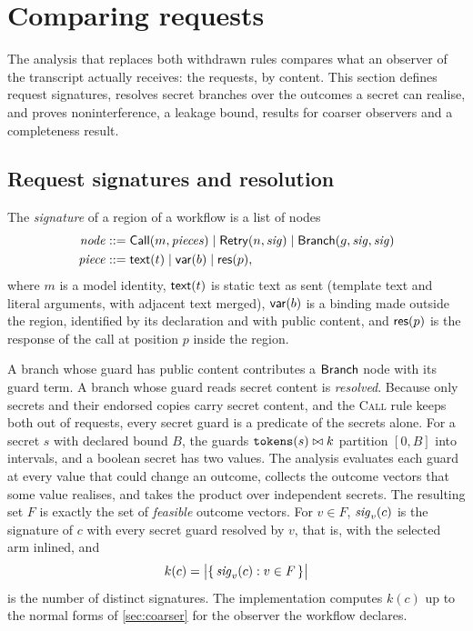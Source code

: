 \section{Comparing requests}\label{sec:requests}

The analysis that replaces both withdrawn rules compares what an observer of the
transcript actually receives: the requests, by content. This section defines
request signatures, resolves secret branches over the outcomes a secret can realise,
and proves noninterference, a leakage bound, results for coarser observers and a
completeness result.

\subsection{Request signatures and resolution}\label{sec:signatures}

\begin{definition}\label{def:signature}
The \emph{signature} of a region of a workflow is a list of nodes
\begin{align*}
\mathit{node} &::= \mathsf{Call}(m, \mathit{pieces}) \mid \mathsf{Retry}(n, \mathit{sig}) \mid
\mathsf{Branch}(g, \mathit{sig}, \mathit{sig}) \\
\mathit{piece} &::= \mathsf{text}(t) \mid \mathsf{var}(b) \mid \mathsf{res}(p),
\end{align*}
where $m$ is a model identity, $\mathsf{text}(t)$ is static text as sent (template text and
literal arguments, with adjacent text merged), $\mathsf{var}(b)$ is a binding made outside
the region, identified by its declaration and with public content, and $\mathsf{res}(p)$ is
the response of the call at position $p$ inside the region.
\end{definition}

A branch whose guard has public content contributes a $\mathsf{Branch}$ node with its
guard term. A branch whose guard reads secret content is \emph{resolved}. Because
only secrets and their endorsed copies carry secret content, and the \textsc{Call}
rule keeps both out of requests, every secret guard is a predicate of the secrets
alone. For a secret $s$ with declared bound $B$, the guards $\texttt{tokens}(s) \bowtie
k$ partition $[0, B]$ into intervals, and a boolean secret has two values. The
analysis evaluates each guard at every value that could change an outcome, collects
the outcome vectors that some value realises, and takes the product over
independent secrets. The resulting set $F$ is exactly the set of \emph{feasible}
outcome vectors. For $v \in F$, $\mathit{sig}_{v}(c)$ is the signature of $c$ with every
secret guard resolved by $v$, that is, with the selected arm inlined, and
\[
k(c) = \bigl|\{\, \mathit{sig}_{v}(c) : v \in F \,\}\bigr|
\]
is the number of distinct signatures. The implementation computes $k(c)$ up to the
normal forms of \cref{sec:coarser} for the observer the workflow declares.

